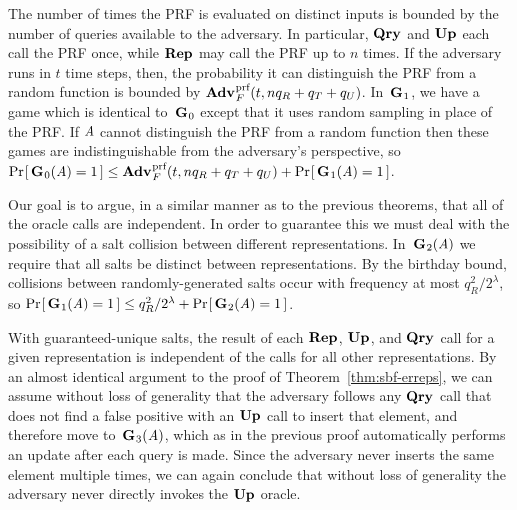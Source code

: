 The number of times the PRF is evaluated on distinct inputs is bounded by the
number of queries available to the adversary. In particular, $\textup{\textbf{Qry}}\hspace{0.5pt}$ and $\textup{\textbf{Up}}\hspace{0.5pt}$
each call the PRF once, while $\textup{\textbf{Rep}}\hspace{0.5pt}$ may call the PRF up to $n$ times. If the
adversary runs in $t$ time steps, then, the probability it can distinguish the
PRF from a random function is bounded by $\Adv{\prf}_F(t,nq_R+q_T+q_U)$.
%
In~$\textup{\textbf{G}}\hspace{0.5pt}_1$, we have a game which is identical to~$\textup{\textbf{G}}\hspace{0.5pt}_0$ except that it uses
random sampling in place of the PRF. If $\mathit{A}$ cannot distinguish the PRF from
a random function then these games are indistinguishable from the adversary's
perspective, so $\Prob{\game_0(\advA) = 1} \le \Adv{\prf}_F(t,nq_R+q_T+q_U) +
\Prob{\game_1(\advA) = 1}$.
%

Our goal is to argue, in a similar manner as to the previous theorems, that all of the oracle calls are independent. In order to guarantee this we must deal with the possibility of a salt collision between different representations. In~$\textup{\textbf{G}}\hspace{0.5pt}_2(\mathit{A})$ we require that all salts be distinct between representations. By the birthday bound, collisions between randomly-generated salts occur with frequency at most $q_R^2/2^\lambda$, so $\Pr\hspace{-1pt}\left[\,\textup{\textbf{G}}\hspace{0.5pt}_1(\mathit{A}) = 1\,\right] \le q_R^2/2^\lambda + \Pr\hspace{-1pt}\left[\,\textup{\textbf{G}}\hspace{0.5pt}_2(\mathit{A}) = 1\,\right]$.

With guaranteed-unique salts, the result of each $\textup{\textbf{Rep}}\hspace{0.5pt}$, $\textup{\textbf{Up}}\hspace{0.5pt}$, and $\textup{\textbf{Qry}}\hspace{0.5pt}$
call for a given representation is independent of the calls for all other
representations. By an almost identical argument to the proof of
Theorem~\ref{thm:sbf-erreps}, we can assume without loss of generality that the
adversary follows any $\textup{\textbf{Qry}}\hspace{0.5pt}$ call that does not find a false positive with an
$\textup{\textbf{Up}}\hspace{0.5pt}$ call to insert that element, and therefore move to~$\textup{\textbf{G}}\hspace{0.5pt}_3(\mathit{A})$,
which as in the previous proof automatically performs an update after each query
is made. Since the adversary never inserts the same element multiple times, we
can again conclude that without loss of generality the adversary never directly
invokes the $\textup{\textbf{Up}}\hspace{0.5pt}$ oracle.
%

